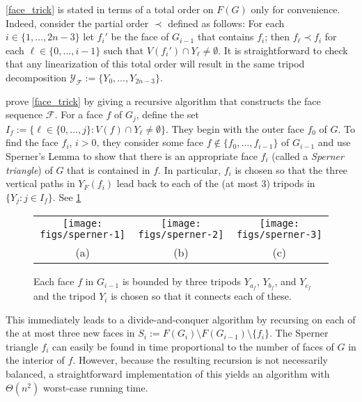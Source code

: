 \documentclass{patmorin}
\begin{document}
\begin{rem}
  \cref{face_trick} is stated in terms of a total order on $F(G)$ only for convenience.  Indeed, consider the partial order $\prec$ defined as follows:  For each $i\in\{1,\ldots,2n-3\}$ let $f_i'$ be the face of $G_{i-1}$ that contains $f_i$; then $f_\ell\prec f_i$ for each $\ell\in\{0,\ldots,i-1\}$ such that $V(f_i')\cap Y_\ell\neq\emptyset$.  It is straightforward to check that any linearization of this total order will result in the same tripod decomposition $\mathcal{Y_F}:=\{Y_0,\ldots,Y_{2n-3}\}$.
\end{rem}

\citet{dujmovic.joret.ea:planar} prove \cref{face_trick} by giving a recursive algorithm that constructs the face sequence $\mathcal{F}$.  For a face $f$ of $G_j$, define the set $I_f:=\{\ell\in\{0,\ldots,j\}:V(f)\cap Y_\ell\neq\emptyset\}$.  They begin with the outer face $f_0$ of $G$.  To find the face $f_i$, $i>0$, they consider some face $f\not\in\{f_0,\ldots,f_{i-1}\}$ of $G_{i-1}$ and use Sperner's Lemma to show that there is an appropriate face $f_i$ (called a \emph{Sperner triangle}) of $G$ that is contained in $f$. In particular, $f_i$ is chosen so that the three vertical paths in $Y_F(f_i)$ lead back to each of the (at most 3) tripods in $\{Y_j:j\in I_f\}$. See \cref{sperner}

\begin{figure}
  \begin{center}
    \begin{tabular}{ccc}
      \texttt{[image: figs/sperner-1]} &
      \texttt{[image: figs/sperner-2]} &
      \texttt{[image: figs/sperner-3]} \\
      (a) & (b) & (c)
    \end{tabular}
  \end{center}
  \caption{Each face $f$ in $G_{i-1}$ is bounded by three tripods $Y_{a_f}$, $Y_{b_f}$, and $Y_{c_f}$ and the tripod $Y_i$ is chosen so that it connects each of these.}
  \label{sperner}
\end{figure}

This immediately leads to a divide-and-conquer algorithm by recursing on each of the at most three new faces in $S_i:=F(G_i)\setminus F(G_{i-1})\setminus \{f_i\}$.  The Sperner triangle $f_i$ can easily be found in time proportional to the number of faces of $G$ in the interior of $f$.  However, because the resulting recursion is not necessarily balanced, a straightforward implementation of this yields an algorithm with $\Theta(n^2)$ worst-case running time.
\end{document}
